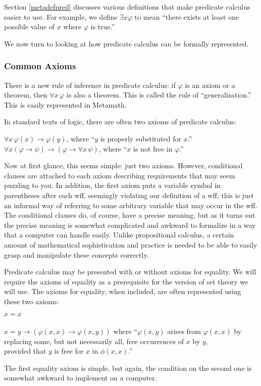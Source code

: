 Section \ref{metadefpred} discusses various definitions
that make predicate calculus easier to use.
For example, we define
$\exists x \varphi$ to mean
``there exists at least one possible value of $x$ where $\varphi$ is true.''

We now turn to looking at how predicate calculus can be formally
represented.

\subsubsection{Common Axioms}

There is a new rule of inference in predicate calculus:  if $\varphi$ is
an axiom or a theorem, then $\forall x \,\varphi$ is also a
theorem.  This is called the rule of
``generalization.''
This is easily represented in Metamath.

In standard texts of logic, there are often two axioms of predicate
calculus:
\begin{center}
  $\forall x \,\varphi ( x ) \rightarrow \varphi ( y )$,
      where ``$y$ is properly substituted for $x$.''\\
  $\forall x ( \varphi \rightarrow \psi )\rightarrow ( \varphi \rightarrow
    \forall x\, \psi )$,
    where ``$x$ is not free in $\varphi$.''
\end{center}

Now at first glance, this seems simple:  just two axioms.  However,
conditional clauses are attached to each axiom describing requirements that
may seem puzzling to you.  In addition, the first axiom puts a variable symbol
in parentheses after each wff, seemingly violating our definition of a
wff; this is just an informal way of
referring to some arbitrary variable that may occur in the wff.  The
conditional clauses do, of course, have a precise meaning, but as it turns out
the precise meaning is somewhat complicated and awkward to formalize in a
way that a computer can handle easily.  Unlike propositional calculus, a
certain amount of mathematical sophistication and practice is needed to be
able to easily grasp and manipulate these concepts correctly.

Predicate calculus may be presented with or without axioms for
equality. We will require the
axioms of equality as a prerequisite for the version of set theory we will
use.  The axioms for equality, when included, are often represented using these
two axioms:
\begin{center}
$x=x$\\ \ \\
$x=y\rightarrow (\varphi(x,x)\rightarrow\varphi(x,y))$ where ``$\varphi(x,y)$
   arises from $\varphi(x,x)$ by replacing some, but not necessarily all,
   free
   occurrences of $x$ by $y$,\\ provided that $y$ is free for $x$
   in $\phi(x,x)$.'' \end{center}
The first equality axiom is simple, but again,
the condition on the second one is
somewhat awkward to implement on a computer.

